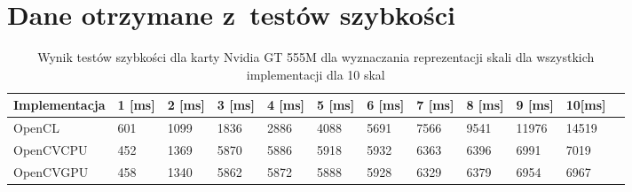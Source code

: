 \chapter{Dane otrzymane z~testów szybkości}
\label{cha:daneTestySzybjkosci}


\begin{table}[h]
\caption{Wynik testów szybkości dla karty Nvidia GT 555M dla wyznaczania reprezentacji skali dla wszystkich implementacji dla 10 skal}
\label{tab:allGT}

\begin{tabular}{|l|l|l|l|l|l|l|l|l|l|l|l|}
\hline
Implementacja & 1 [ms] & 2 [ms] & 3 [ms] & 4  [ms]  & 5 [ms]   & 6 [ms]   & 7  [ms]  & 8 [ms]   & 9 [ms]    & 10[ms]    \\ \hline
OpenCL               & 601        & 1099              & 1836     & 2886 & 4088 & 5691 & 7566 & 9541 & 11976 & 14519 \\ \hline
OpenCVCPU            & 452        & 1369              & 5870     & 5886 & 5918 & 5932 & 6363 & 6396 & 6991  & 7019  \\ \hline
OpenCVGPU            & 458        & 1340              & 5862     & 5872 & 5888 & 5928 & 6329 & 6379 & 6954  & 6967  \\ \hline
\end{tabular}
\end{table}

